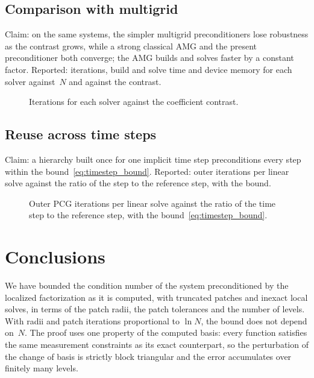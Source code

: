 \documentclass[hidelinks]{siamart}
\theoremstyle{nonumberplain}
\numberwithin{theorem}{section}
\begin{document}
\subsection{Comparison with multigrid}
\label{sec:exp:baselines}
Claim: on the same systems, the simpler multigrid preconditioners lose
robustness as the contrast grows, while a strong classical AMG and the
present preconditioner both converge; the AMG builds and solves faster
by a constant factor.  Reported: iterations, build and solve time and
device memory for each solver against~$N$ and against the contrast.
\begin{table}[tbp]
\centering
\caption{Iterations, build time, solve time and device memory for each solver against $N$.}
\label{tab:exp_baselines_N}
\end{table}

\begin{figure}[tbp]
\centering
{}
\caption{Iterations for each solver against the coefficient contrast.}
\label{fig:exp_baselines_contrast}
\end{figure}

\subsection{Reuse across time steps}
\label{sec:exp:timestep}
Claim: a hierarchy built once for one implicit time step preconditions
every step within the bound~\eqref{eq:timestep_bound}.
Reported: outer iterations per linear solve against the ratio of the
step to the reference step, with the bound.
\begin{figure}[tbp]
\centering
{}
\caption{Outer PCG iterations per linear solve against the ratio of the time step to the reference step, with the bound~\eqref{eq:timestep_bound}.}
\label{fig:exp_timestep}
\end{figure}

\section{Conclusions}
\label{sec:conclusions}

We have bounded the condition number of the system preconditioned by the
localized factorization as it is computed, with truncated patches and
inexact local solves, in terms of the patch radii, the patch tolerances
and the number of levels.  With radii and patch iterations proportional
to $\ln N$, the bound does not depend on~$N$.  The proof uses one
property of the computed basis: every function satisfies the same
measurement constraints as its exact counterpart, so the perturbation of
the change of basis is strictly block triangular and the error
accumulates over finitely many levels.
\end{document}
